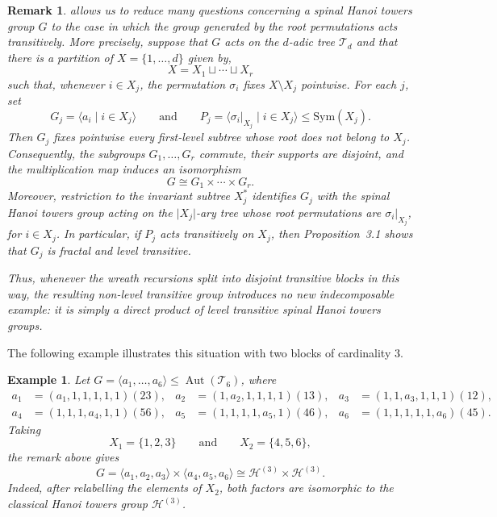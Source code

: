 \documentclass[11pt,leqno]{amsart}
\theoremstyle{plain}
\newtheorem{example}[example]{Example}
\newtheorem{remark}[remark]{Remark}
\newcommand\T{{\mathcal{T}}}
\DeclareMathOperator{\Aut}{Aut}
\newcommand{\Sym}{\mathrm{Sym}}
\numberwithin{equation}{section}
\begin{document}
\begin{remark}
	 allows us to reduce many questions concerning a spinal Hanoi towers group $G$ to the case in which
	the group generated by the root permutations acts transitively. More
	precisely, suppose that $G$ acts on the $d$-adic tree $\T_d$ and that there is a partition of $X=\{1,\ldots,d\}$ given by,
	\[
	X=X_1\sqcup\cdots\sqcup X_r
	\]
	such that, whenever $i\in X_j$, the permutation $\sigma_i$ fixes
	$X\setminus X_j$ pointwise. For each $j$, set
	\[
	G_j=\langle a_i\mid i\in X_j\rangle
	\qquad\text{and}\qquad
	P_j=\langle \sigma_i|_{X_j}\mid i\in X_j\rangle
	\leq \Sym(X_j).
	\]
	Then $G_j$ fixes pointwise every first-level subtree whose root does
	not belong to $X_j$. Consequently, the subgroups $G_1,\ldots,G_r$
	commute, their supports are disjoint, and the multiplication map induces
	an isomorphism
	\[
	G\cong G_1\times\cdots\times G_r.
	\]
	Moreover, restriction to the invariant subtree $X_j^*$ identifies
	$G_j$ with the spinal Hanoi towers group acting on the
	$\lvert X_j\rvert$-ary tree whose root permutations are
	$\sigma_i|_{X_j}$, for $i\in X_j$. In particular, if $P_j$ acts
	transitively on $X_j$, then Proposition~3.1 shows that $G_j$ is
	fractal and level transitive.
	
	Thus, whenever the wreath recursions split into disjoint transitive
	blocks in this way, the resulting non-level transitive group introduces
	no new indecomposable example: it is simply a direct product of
	level transitive spinal Hanoi towers groups.
\end{remark}
The following example illustrates this situation with two blocks of cardinality $3$.
\begin{example}
	Let $G=\langle a_1,\ldots,a_6\rangle\leq\Aut(\T_6)$, where
	\[
	\begin{aligned}
		a_1&=(a_1,1,1,1,1,1)(23),&
		a_2&=(1,a_2,1,1,1,1)(13),&
		a_3&=(1,1,a_3,1,1,1)(12),\\
		a_4&=(1,1,1,a_4,1,1)(56),&
		a_5&=(1,1,1,1,a_5,1)(46),&
		a_6&=(1,1,1,1,1,a_6)(45).
	\end{aligned}
	\]
	Taking
	\[
	X_1=\{1,2,3\}
	\qquad\text{and}\qquad
	X_2=\{4,5,6\},
	\]
	the  remark above gives
	\[
	G
	=\langle a_1,a_2,a_3\rangle
	\times
	\langle a_4,a_5,a_6\rangle
	\cong \mathcal{H}^{(3)}\times \mathcal{H}^{(3)}.
	\]
	Indeed, after relabelling the elements of $X_2$, both factors are
	isomorphic to the classical Hanoi towers group $\mathcal{H}^{(3)}$.
\end{example}
\end{document}
